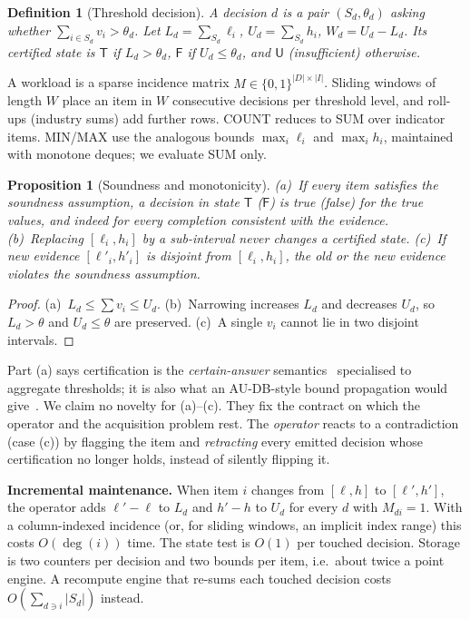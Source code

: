 \documentclass[conference]{IEEEtran}
\newtheorem{definition}{Definition}
\newtheorem{proposition}{Proposition}
\newcommand{\T}{\textsf{T}\xspace}
\newcommand{\F}{\textsf{F}\xspace}
\newcommand{\U}{\textsf{U}\xspace}
\begin{document}
\begin{definition}[Threshold decision]
A decision $d$ is a pair $(S_d,\theta_d)$ asking whether $\sum_{i\in S_d}v_i>\theta_d$. Let
$L_d=\sum_{S_d}\ell_i$, $U_d=\sum_{S_d}h_i$, $W_d=U_d-L_d$. Its certified state is $\T$ if $L_d>\theta_d$,
$\F$ if $U_d\le\theta_d$, and $\U$ (insufficient) otherwise.
\end{definition}
A workload is a sparse incidence matrix $M\in\{0,1\}^{|D|\times|I|}$. Sliding windows of length $W$ place an item in
$W$ consecutive decisions per threshold level, and roll-ups (industry sums) add further rows. COUNT reduces to
SUM over indicator items. MIN/MAX use the analogous bounds $\max_i \ell_i$ and $\max_i h_i$, maintained with
monotone deques; we evaluate SUM only.

\begin{proposition}[Soundness and monotonicity]
\label{prop:sound}
(a)~If every item satisfies the soundness assumption, a decision in state $\T$ ($\F$) is true (false) for the true
values, and indeed for every completion consistent with the evidence. (b)~Replacing $[\ell_i,h_i]$ by a sub-interval
never changes a certified state. (c)~If new evidence $[\ell'_i,h'_i]$ is disjoint from $[\ell_i,h_i]$, the old or
the new evidence violates the soundness assumption.
\end{proposition}
\begin{proof}
(a)~$L_d\le\sum v_i\le U_d$. (b)~Narrowing increases $L_d$ and decreases $U_d$, so $L_d>\theta$ and $U_d\le\theta$
are preserved. (c)~A single $v_i$ cannot lie in two disjoint intervals.
\end{proof}
Part (a) says certification is the \emph{certain-answer} semantics~\cite{imielinski1984,libkin2016} specialised to
aggregate thresholds; it is also what an AU-DB-style bound propagation would give~\cite{feng2021audb}. We claim no novelty for
(a)--(c). They fix the contract on which the operator and the acquisition problem rest. The \emph{operator}
reacts to a contradiction (case (c)) by flagging the item and \emph{retracting} every emitted decision whose
certification no longer holds, instead of silently flipping it.

\textbf{Incremental maintenance.} When item $i$ changes from $[\ell,h]$ to $[\ell',h']$, the operator adds
$\ell'-\ell$ to $L_d$ and $h'-h$ to $U_d$ for every $d$ with $M_{di}=1$. With a column-indexed incidence (or, for
sliding windows, an implicit index range) this costs $O(\deg(i))$ time. The state test is $O(1)$ per touched
decision. Storage is two counters per decision and two bounds per item, i.e.\ about twice a point engine. A
recompute engine that re-sums each touched decision costs $O(\sum_{d\ni i}|S_d|)$ instead.
\end{document}
